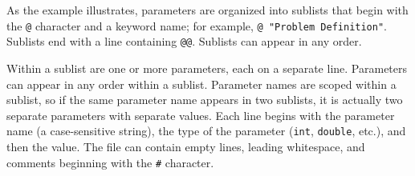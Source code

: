 As the example illustrates, parameters are organized into sublists that begin
with the {\tt @} character and a keyword name; for example,
{\tt @ "Problem Definition"}.  Sublists end with a line containing {\tt @@}.
Sublists can appear in any order.

Within a sublist are one or more parameters, each on a separate line.
Parameters can appear in any order within a sublist.  Parameter names are
scoped within a sublist, so if the same parameter name appears in two
sublists, it is actually two separate parameters with separate values.
Each line begins with the parameter name (a case-sensitive string), the type
of the parameter ({\tt int}, {\tt double}, etc.), and then the value.
The file can contain empty lines, leading whitespace, and comments beginning
with the {\tt \#} character.

